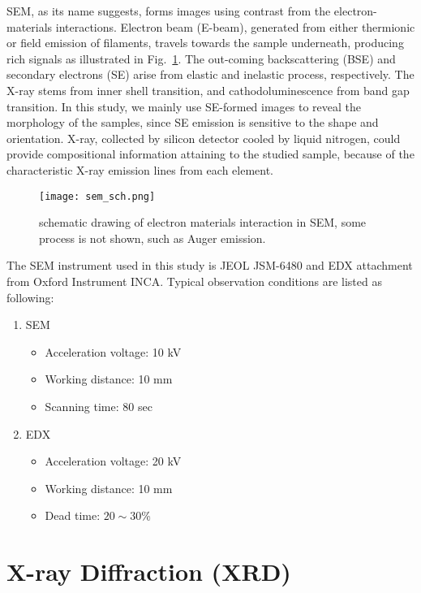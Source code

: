 SEM, as its name suggests, forms images using contrast from the electron-materials interactions. Electron beam (E-beam), generated from either thermionic or field emission of filaments, travels towards the sample underneath, producing rich signals as illustrated in Fig.~\ref{fig:ch2sem}. The out-coming backscattering (BSE) and secondary electrons (SE) arise from elastic and inelastic process, respectively. The X-ray stems from inner shell transition, and cathodoluminescence from band gap transition. In this study, we mainly use SE-formed images to reveal the morphology of the samples, since SE emission is sensitive to the shape and orientation. X-ray, collected by silicon detector cooled by liquid nitrogen, could provide compositional information attaining to the studied sample, because of the characteristic X-ray emission lines from each element. 

\begin{figure}[htb]
\centering
\texttt{[image: sem\_sch.png]}
\caption[SEM excitation volume]{schematic drawing of electron materials interaction in SEM, some process is not shown, such as Auger emission.}
\label{fig:ch2sem}
\end{figure}

The SEM instrument used in this study is JEOL JSM-6480 and EDX attachment from Oxford Instrument INCA. Typical observation conditions are listed as following:

\begin{enumerate}
\item SEM
\begin{itemize}

\item Acceleration voltage: 10 kV
\item Working distance: 10 mm
\item Scanning time: 80 sec
\end{itemize}
\item EDX
\begin{itemize}

\item Acceleration voltage: 20 kV
\item Working distance: 10 mm
\item Dead time: $20\sim30$\%
\end{itemize}
\end{enumerate}

\section{X-ray Diffraction (XRD)}

